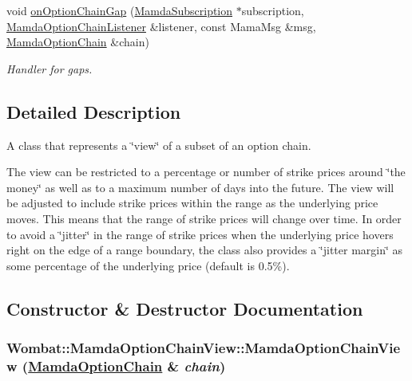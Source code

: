 \begin{CompactItemize}
void \hyperlink{classWombat_1_1MamdaOptionChainView_989c1ca9d94e400765440ced2b9ba9a0}{on\-Option\-Chain\-Gap} (\hyperlink{classWombat_1_1MamdaSubscription}{Mamda\-Subscription} $\ast$subscription, \hyperlink{classWombat_1_1MamdaOptionChainListener}{Mamda\-Option\-Chain\-Listener} \&listener, const Mama\-Msg \&msg, \hyperlink{classWombat_1_1MamdaOptionChain}{Mamda\-Option\-Chain} \&chain)
\begin{CompactList}\small\item\em Handler for gaps. \item\end{CompactList}\end{CompactItemize}


\subsection{Detailed Description}
A class that represents a \char`\"{}view\char`\"{} of a subset of an option chain. 

The view can be restricted to a percentage or number of strike prices around \char`\"{}the money\char`\"{} as well as to a maximum number of days into the future. The view will be adjusted to include strike prices within the range as the underlying price moves. This means that the range of strike prices will change over time. In order to avoid a \char`\"{}jitter\char`\"{} in the range of strike prices when the underlying price hovers right on the edge of a range boundary, the class also provides a \char`\"{}jitter margin\char`\"{} as some percentage of the underlying price (default is 0.5\%). 



\subsection{Constructor \& Destructor Documentation}
\hypertarget{classWombat_1_1MamdaOptionChainView_43112fa4380c42105f61f5b96f5968f2}{
\subsubsection[MamdaOptionChainView]{\setlength{\rightskip}{0pt plus 5cm}Wombat::Mamda\-Option\-Chain\-View::Mamda\-Option\-Chain\-View (\hyperlink{classWombat_1_1MamdaOptionChain}{Mamda\-Option\-Chain} \& {\em chain})}}
\label{classWombat_1_1MamdaOptionChainView_43112fa4380c42105f61f5b96f5968f2}


